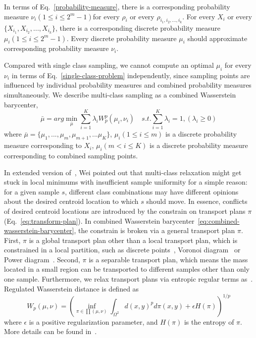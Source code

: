In terms of Eq.~\ref{probability-measure},
there is a corresponding probability measure $\nu_i(1\leq i\leq 2^m-1)$for every $\rho_i$ or every  $\rho_{{i_1,i_2,...,i_k}}$.
For every $X_i$ or every $\{X_{i_1}, X_{i_2},...,X_{i_k}\}$, there is a corresponding discrete probability measure $\mu_i(1\leq i\leq 2^m-1)$.
Every discrete probability measure $\mu_i$ should approximate corresponding probability measure $\nu_i$.

Compared with single class sampling,
we cannot compute an optimal $\mu_i$ for every $\nu_i$ in terms of Eq.~\ref{single-class-problem} independently,
since sampling points are influenced by individual probability measures and combined probability measures simultaneously.
We describe multi-class sampling as a combined Wasserstein barycenter,
\begin{equation}\label{eq:combined-wasserstein-barycenter}
 \bar\mu=arg\min\limits_{\bar\mu}\sum\limits_{i=1}^K\lambda_iW_p^p(\mu_i,\nu_i) \quad
  s.t.\sum\limits_{i=1}^K\lambda_i=1,(\lambda_i\geq0)
\end{equation}
where $\bar\mu=\{\mu_1,...,\mu_m,\mu_{m+1},...\mu_{K}\}$,
$\mu_i(1\leq i\leq m)$  is a discrete probability measure corresponding to $X_i$,
$\mu_i(m < i\leq K)$ is a discrete probability measure corresponding to combined sampling points.

In extended version of~\cite{wei:2010:multi},
Wei pointed out that multi-class relaxation might get stuck in local minimums with insufficient sample
uniformity for a simple reason: for a given sample $s$,
different class combinations may have different opinions about the desired centroid
location to which $s$ should move.
In essence,
conflicts of desired centroid locations are introduced by the constrain on transport plans $\pi$ (Eq.~\ref{eq:transform-plan}).
In combined Wasserstein barycenter~\ref{eq:combined-wasserstein-barycenter},
the constrain is broken via a general transport plan $\pi$.
First,
$\pi$ is a global transport plan other than a local transport plan,
which is constrained in a local partition,
such as discrete points~\cite{balzer:2009:capacity},
Voronoi diagram~\cite{chen:2012:variational} or Power diagram~\cite{de:2012:blue}.
Second,
$\pi$ is a separable transport plan,
which means the mass located in a small region can be transported to different samples other than only one sample.
Furthermore,
we relax transport plans via entropic regular terms as~\cite{cuturi:2013:sinkhorn}.
Regulated Wasserstein distance is defined as
\begin{equation}\label{eq:regulate-wasserstein-distance}
 W_p(\mu,\nu)=\left(\inf\limits_{\pi\in\prod(\mu,\nu)}\int_{\Omega^2}d(x,y)^pd\pi(x,y)+\epsilon H(\pi)\right )^{1/p}
\end{equation}
where $\epsilon$ is a positive regularization parameter,
and $H(\pi)$ is the entropy of $\pi$.
More details can be found in~\cite{cuturi:2013:sinkhorn}.

